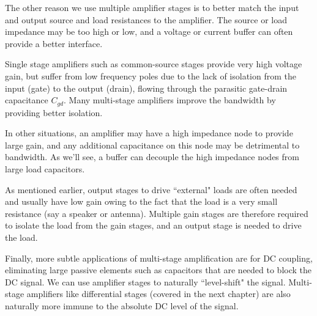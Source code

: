 The other reason we use multiple amplifier stages is to better match the input and output source and load resistances to the amplifier.  The source or load impedance may be too high or low, and a voltage or current buffer can often provide a better interface.  
 
Single stage amplifiers such as common-source stages provide very high voltage gain, but suffer from low frequency poles due to the lack of isolation from the input (gate) to the output (drain), flowing through the parasitic gate-drain capacitance $C_{gd}$.  Many multi-stage amplifiers improve the bandwidth by providing better isolation.  

In other situations, an amplifier may have a high impedance node to provide large gain, and any additional capacitance on this node may be detrimental to bandwidth.  As we'll see, a buffer can decouple the high impedance nodes from large load capacitors.  
 
As mentioned earlier, output stages to drive ``external" loads are often needed and usually have low gain owing to the fact that the load is a very small resistance (say a speaker or antenna).  Multiple gain stages are therefore required to isolate the load from the gain stages, and an output stage is needed to drive the load.  

Finally, more subtle applications of multi-stage amplification are for DC coupling, eliminating large passive elements such as capacitors that are needed to block the DC signal.   We can use amplifier stages to naturally ``level-shift" the signal.  Multi-stage amplifiers like differential stages (covered in the next chapter) are also naturally more immune to the absolute DC level of the signal.  
 

\section{\topicA}






 





